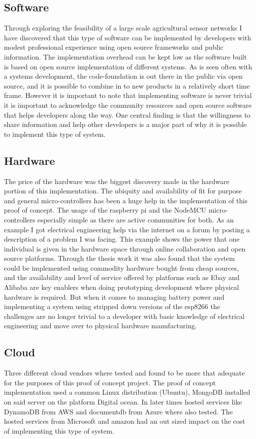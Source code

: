\documentclass[]{uiophd}
\begin{document}
\subsection{Software}
Through exploring the feasibility of a large scale agricultural sensor networks I have discovered that this type of software can be implemented by developers with modest professional experience using open source frameworks and public information. The implementation overhead can be kept low as the software built is based on open source implementation of different systems. As is seen often with a systems development, the code-foundation is out there in the public via open source, and it is possible to combine in to new products in a relatively short time frame. However it is important to note that implementing software is never trivial it is important to acknowledge the community resources and open source software that helps developers along the way. One central finding is that the willingness to share information and help other developers is a major part of why it is possible to implement this type of system.

\subsection{Hardware}
The price of the hardware was the biggest discovery made in the hardware portion of this implementation. The ubiquity and availability of fit for purpose and general micro-controllers has been a huge help in the implementation of this proof of concept. The usage of the raspberry pi and the NodeMCU micro-controllers especially simple as there are active communities for both. As an example I got electrical engineering help via the internet on a forum by posting a description of a problem I was facing. This example shows the power that one individual is given in the hardware space through online collaboration and open source platforms. Through the thesis work it was also found that the system could be implemented using commodity hardware bought from cheap sources, and the availability and level of service offered by platforms such as Ebay and Alibaba are key enablers when doing prototyping development where physical hardware is required. But when it comes to managing battery power and implementing a system using stripped down versions of the esp8266 \cite{espressif} the challenges are no longer trivial to a developer with basic knowledge of electrical engineering and move over to physical hardware manufacturing.

\subsection{Cloud}
Three different cloud vendors where tested and found to be more that adequate for the purposes of this proof of concept project. The proof of concept implementation used a common Linux distribution (Ubuntu), MongoDB installed on said server on the platform Digital ocean. In later times hosted services like DynamoDB from AWS and documentdb from Azure where also tested. The hosted services from Microsoft and amazon had an out sized impact on the cost of implementing this type of system.
\end{document}
